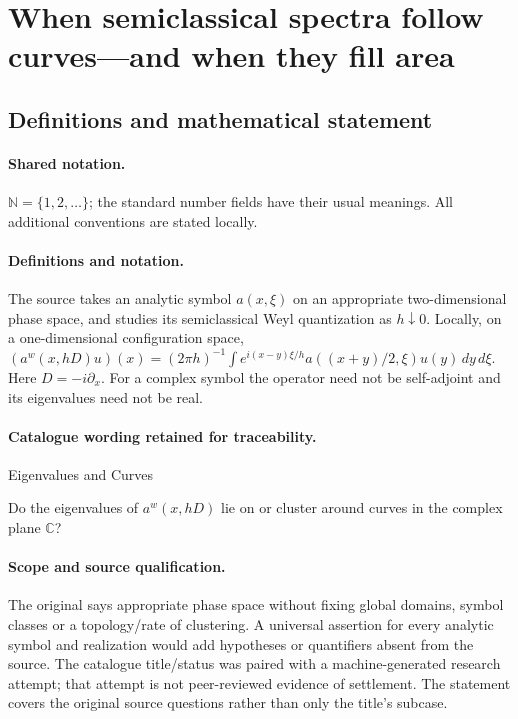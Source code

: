 \documentclass[11pt]{article}
\begin{document}
\section{When semiclassical spectra follow curves—and when they fill area}\label{statement}

\subsection{Definitions and mathematical statement}

\paragraph{Shared notation.}$\mathbb N=\{1,2,\ldots\}$; the standard number fields have their usual meanings. All additional conventions are stated locally.


\paragraph{Definitions and notation.}The source takes an analytic symbol $a(x,\xi)$ on an appropriate two-dimensional phase space, and studies its semiclassical Weyl quantization as $h\downarrow0$. Locally, on a one-dimensional configuration space, $(a^w(x,hD)u)(x)=(2\pi h)^{-1}\int e^{i(x-y)\xi/h}a((x+y)/2,\xi)u(y)\,dy\,d\xi$. Here $D=-i\partial_x$. For a complex symbol the operator need not be self-adjoint and its eigenvalues need not be real.

\paragraph{Catalogue wording retained for traceability.}
Eigenvalues and Curves

Do the eigenvalues of $a^w(x,hD)$ lie on or cluster around curves in the complex plane $\mathbb{C}$?
\paragraph{Scope and source qualification.}The original says appropriate phase space without fixing global domains, symbol classes or a topology/rate of clustering. A universal assertion for every analytic symbol and realization would add hypotheses or quantifiers absent from the source. The catalogue title/status was paired with a machine-generated research attempt; that attempt is not peer-reviewed evidence of settlement. The statement covers the original source questions rather than only the title’s subcase.
\end{document}
